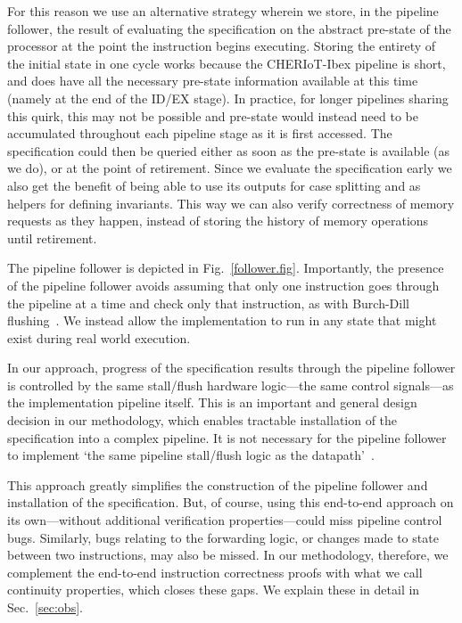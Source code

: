 \documentclass[10pt,conference]{IEEEtran}
\begin{document}
For this reason we use an alternative strategy wherein we store, in the pipeline follower,
the result of evaluating the specification on the abstract pre-state of the processor
at the point the instruction begins executing.
Storing the entirety of the initial state in one cycle works because the CHERIoT-Ibex pipeline is short,
and does have all the necessary pre-state information available at this time
(namely at the end of the ID/EX stage). In practice, for longer pipelines sharing this quirk,
this may not be possible and pre-state would instead need to be
accumulated throughout each pipeline stage as it is first accessed. The specification could then be
queried either as soon as the pre-state is available (as we do), or at the point of retirement.
Since we evaluate the specification early we also get the benefit of being able to use its outputs for
case splitting and as helpers for defining invariants. This way we can also verify correctness of memory
requests as they happen, instead of storing the history of memory operations until retirement.


The pipeline follower is depicted in Fig.~\ref{follower.fig}.  Importantly,
the presence of the pipeline follower avoids assuming that only one instruction
goes through the pipeline at a time and check only that instruction, as with
Burch-Dill flushing~\cite{10.1007/3-540-58179-0_44}.  We instead allow the
implementation to run in any state that might exist during real world
execution.

In our approach, progress of the specification results through the pipeline
follower is controlled by the same stall/flush hardware logic---the same
control signals---as the implementation pipeline itself. This is an
important and general design decision in our methodology, which enables
tractable installation of the specification into a complex pipeline. It is
not necessary for the pipeline follower to implement `the same pipeline
stall/flush logic as the datapath'~\cite{Reid-2016-EEV}.

This approach greatly simplifies the construction of the pipeline follower
and installation of the specification. But, of course, using this
end-to-end approach on its own---without additional verification
properties---could miss pipeline control bugs. Similarly, bugs relating to
the forwarding logic, or changes made to state between two instructions,
may also be missed. In our methodology, therefore, we complement the
end-to-end instruction correctness proofs with what we call continuity
properties, which closes these gaps. We explain these in detail in
Sec.~\ref{sec:obs}.
\end{document}
